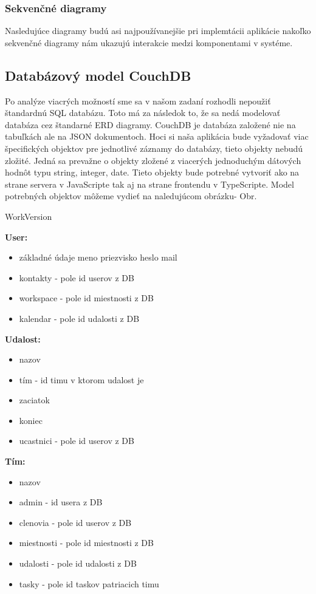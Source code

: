 \subsubsection{Sekvenčné diagramy}
\indent Nasledujúce diagramy budú asi najpoužívanejšie pri implemtácii aplikácie nakoľko sekvenčné diagramy nám ukazujú interakcie medzi komponentami v systéme.

\subsection{Databázový model CouchDB}
\indent Po analýze viacrých možností sme sa v našom zadaní rozhodli nepoužiť štandardnú SQL databázu. Toto má za následok to, že sa nedá modelovať databáza cez štandarné ERD diagramy. CouchDB je databáza založené nie na tabuľkách ale na JSON dokumentoch. Hoci si naša aplikácia bude vyžadovať viac špecifických objektov pre jednotlivé záznamy do databázy, tieto objekty nebudú zložité. Jedná sa prevažne o objekty zložené z viacerých jednoduchým dátových hodnôt typu string, integer, date. Tieto objekty bude potrebné vytvoriť ako na strane servera v JavaScripte tak aj na strane frontendu v TypeScripte. Model potrebných objektov môžeme vydieť na naledujúcom obrázku- Obr. 

WorkVersion

\textbf{User:}
\indent\begin{itemize}
    \item základné údaje meno priezvisko heslo mail
    \item kontakty - pole id userov z DB
    \item workspace - pole id miestnosti z DB
    \item kalendar - pole id udalosti z DB
\end{itemize}

\textbf{Udalost:}
\indent\begin{itemize}
    \item nazov
    \item tím - id timu v ktorom udalost je
    \item zaciatok
    \item koniec
    \item ucastnici - pole id userov z DB
\end{itemize}

\textbf{Tím:}
\indent\begin{itemize}
    \item nazov
    \item admin - id usera z DB
    \item clenovia - pole id userov z DB 
    \item miestnosti - pole id miestnosti z DB
    \item udalosti - pole id udalosti z DB 
    \item tasky - pole id taskov patriacich timu
\end{itemize}

